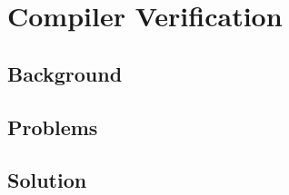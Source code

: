 \chapter{\;\;\;\;Compiler Verification}
\label{sec:compiler}

\section{Background}
\label{sec:compiler:background}

\section{Problems}
\label{sec:compiler:problems}

\section{Solution}
\label{sec:compiler:solution}
